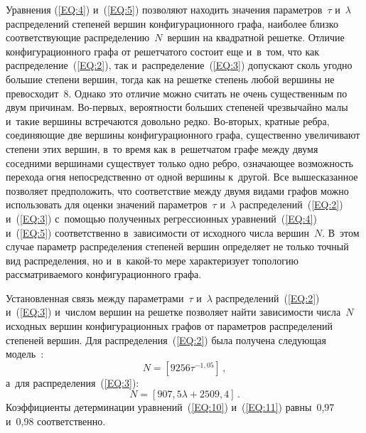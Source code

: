 \begin{multicols}{2}
Уравнения (\ref{EQ:4}) и~(\ref{EQ:5}) позволяют находить значения
параметров~$\tau$ и~$\lambda$ распределений степеней вершин конфигурационного
графа, наиболее близко соответствующие распределению~$N$~вершин на квадратной
решетке. Отличие конфигурационного графа от решетчатого состоит еще и~в~том, что
как распределение~(\ref{EQ:2}), так и~распределение~(\ref{EQ:3}) допускают сколь
угодно большие степени вершин, тогда как на решетке степень любой вершины не
превосходит~8. Однако это отличие можно считать не очень существенным по двум причинам.
Во-пер\-вых, вероятности больших степеней чрезвычайно малы и~такие вершины
встречаются довольно редко. Во-вто\-рых, кратные реб\-ра, соединяющие две вершины
конфигурационного графа, существенно увеличивают степени этих вершин, в~то
время как в~решетчатом графе между двумя соседними вершинами существует только
одно реб\-ро, означающее возможность перехода огня непосредственно от
одной вершины к~другой. Все вышесказанное поз\-во\-ля\-ет предположить, что соответствие
между двумя видами графов можно использовать для оценки значений
параметров~$\tau$ и~$\lambda$ распределений~(\ref{EQ:2}) и~(\ref{EQ:3})
с~помощью полученных
регрессионных уравнений~(\ref{EQ:4}) и~(\ref{EQ:5}) соответственно в~зависимости
от исходного чис\-ла вершин~$N$. В~этом случае параметр распределения степеней вершин
определяет не только точный вид распределения, но и~в~ка\-кой-то мере характеризует
топологию рассматриваемого конфигурационного графа.

Установленная связь между параметрами~$\tau$ и~$\lambda$ распределений~(\ref{EQ:2})
и~(\ref{EQ:3}) и~чис\-лом вершин на решетке позволяет найти зависимости чис\-ла~$N$
исходных вершин конфигурационных графов от параметров распределений степеней вершин.
Для распределения~(\ref{EQ:2}) была получена следующая модель~\cite{Ler1}:
\begin{equation}
\label{EQ:10}
N = \left[9256\tau^{-1,05}\right]\,,
\end{equation}
а~для распределения~(\ref{EQ:3}):
\begin{equation}
\label{EQ:11}
N = \left[907{,}5\lambda+2509{,}4\right]\,.
\end{equation}
Коэффициенты детерминации уравнений~(\ref{EQ:10}) и~(\ref{EQ:11})
равны~0,97 и~0,98 соответственно.

\begin{figure*} %
 \vspace*{1pt}
  \begin{center}
 \mbox{%
 \epsfxsize=158.949mm
 }
\end{center}
 \vspace*{-9pt}
\vspace*{6pt}
\end{figure*}



\end{multicols}
